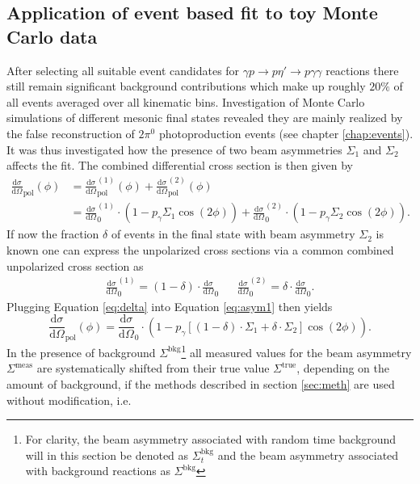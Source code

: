 \subsection{Application of event based fit to toy Monte Carlo data}
After selecting all suitable event candidates for $\gamma p \to p \eta'\to p\gamma\gamma$ reactions there still remain significant background contributions which make up roughly $20\%$ of all events averaged over all kinematic bins. Investigation of Monte Carlo simulations of different mesonic final states revealed they are mainly realized by the false reconstruction of $2\pi^0$ photoproduction events (see chapter \ref{chap:events}). It was thus investigated how the presence of two beam asymmetries $\Sigma_1$ and $\Sigma_2$ affects the fit. The combined differential cross section is then given by \begin{align}
	\frac{\text{d}\sigma}{\text{d}\Omega}_\text{pol}\left(\phi\right)&=\frac{\text{d}\sigma}{\text{d}\Omega}_\text{pol}^{(1)}\left(\phi\right)+\frac{\text{d}\sigma}{\text{d}\Omega}_\text{pol}^{(2)}\left(\phi\right)\\&=\frac{\text{d}\sigma}{\text{d}\Omega}_0^{(1)}\cdot\left(1-p_\gamma\Sigma_1\cos\left(2\phi\right)\right)+\frac{\text{d}\sigma}{\text{d}\Omega}_0^{(2)}\cdot\left(1-p_\gamma\Sigma_2\cos\left(2\phi\right)\right).
	\label{eq:asym1}
\end{align}
If now the fraction $\delta$ of events in the final state with beam asymmetry $\Sigma_2$ is known one can express the unpolarized cross sections via a common combined unpolarized cross section as
\begin{align}
	\frac{\text{d}\sigma}{\text{d}\Omega}_0^{(1)}=\left(1-\delta\right)\cdot\frac{\text{d}\sigma}{\text{d}\Omega}_0&&\frac{\text{d}\sigma}{\text{d}\Omega}_0^{(2)}=\delta\cdot\frac{\text{d}\sigma}{\text{d}\Omega}_0.
	\label{eq:delta}
\end{align}
Plugging Equation \eqref{eq:delta} into Equation \eqref{eq:asym1} then yields
\begin{equation}
	\frac{\text{d}\sigma}{\text{d}\Omega}_\text{pol}\left(\phi\right)=\frac{\text{d}\sigma}{\text{d}\Omega}_0\cdot\left(1-p_\gamma\left[\left(1-\delta\right)\cdot\Sigma_1+\delta\cdot\Sigma_2\right]\cos\left(2\phi\right)\right).
\end{equation}
In the presence of background $\Sigma^\text{bkg}$\footnote{For clarity, the beam asymmetry associated with random time background will in this section be denoted as $\Sigma^\text{bkg}_t$ and the beam asymmetry associated with background reactions as $\Sigma^\text{bkg}$} all measured values for the beam asymmetry $\Sigma^\text{meas}$ are systematically shifted from their true value $\Sigma^\text{true}$, depending on the amount of background, if the methods described in section \ref{sec:meth} are used without modification, i.e.
